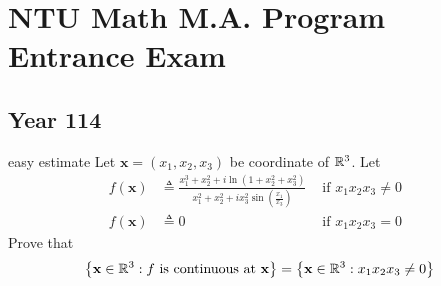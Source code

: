 \documentclass{report}
\begin{document}
\chapter{NTU Math M.A. Program Entrance Exam}
\section{Year 114}
\begin{question}{easy estimate}{}
Let $\textbf{x}=(x_1,x_2,x_3)$ be coordinate of $\mathbb{R}^3$. Let 
\begin{align*}
  f(\textbf{x})&\triangleq  \frac{x_1^3+x_2^2+i \ln (1+x_2^2+ x_3^2)}{x_1^2+x_2^2+i x_3^2 \sin \left( \frac{x_1}{x_3} \right)} &\text{ if $x_1x_2x_3\neq 0$ }\\
  f(\textbf{x})&\triangleq  0  &\text{ if }x_1x_2x_3=0
\end{align*}
Prove that 
\begin{align*}
\left\{ \textbf{x}\in\mathbb{R}^3:f\text{ is continuous at }\textbf{x} \right\}=\left\{ \textbf{x}\in\mathbb{R}^3:x_1x_2x_3\neq 0 \right\}
\end{align*}
\end{question}
\end{document}
